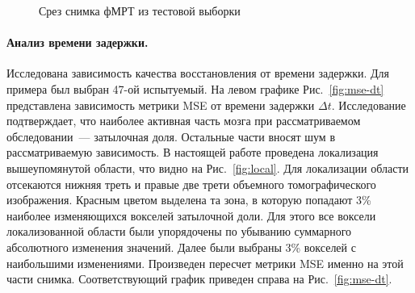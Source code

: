 \begin{figure}[h!]
	\centering
	\hfill
	\hfill
	\caption{Срез снимка фМРТ из тестовой выборки}
	\label{fig:example}
\end{figure}

\paragraph*{Анализ времени задержки.}

Исследована зависимость качества восстановления от времени задержки.
Для примера был выбран 47-ой испытуемый.
На левом графике Рис.~\ref{fig:mse-dt} представлена зависимость метрики MSE
от времени задержки $\Delta t$.
Исследование \citep{anderson2006} подтверждает, что наиболее активная часть мозга
при рассматриваемом обследовании~--- затылочная доля.
Остальные части вносят шум в рассматриваемую зависимость.
В настоящей работе проведена локализация вышеупомянутой области, 
что видно на Рис.~\ref{fig:local}.
Для локализации области отсекаются нижняя треть и правые две трети объемного
томографического изображения.
Красным цветом выделена та зона, в которую попадают 3\% наиболее 
изменяющихся вокселей затылочной доли.
Для этого все воксели локализованной области были упорядочены по 
убыванию суммарного абсолютного изменения значений.
Далее были выбраны 3\% вокселей с наибольшими изменениями.
Произведен пересчет метрики MSE именно на этой части снимка.
Соответствующий график приведен справа на Рис.~\ref{fig:mse-dt}.

